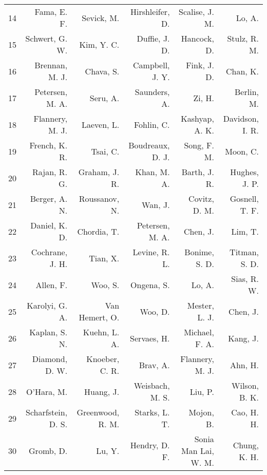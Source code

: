 \begin{tabular}{lrrrrr}
14 &                       Fama, E. F. &             Sevick, M. &        Hirshleifer, D. &         Scalise, J. M. &                 Lo, A. \\
15 &                    Schwert, G. W. &             Kim, Y. C. &          Duffie, J. D. &            Hancock, D. &           Stulz, R. M. \\
16 &                    Brennan, M. J. &              Chava, S. &        Campbell, J. Y. &            Fink, J. D. &               Chan, K. \\
17 &                   Petersen, M. A. &               Seru, A. &           Saunders, A. &                 Zi, H. &             Berlin, M. \\
18 &                   Flannery, M. J. &             Laeven, L. &             Fohlin, C. &         Kashyap, A. K. &        Davidson, I. R. \\
19 &                     French, K. R. &               Tsai, C. &       Boudreaux, D. J. &            Song, F. M. &               Moon, C. \\
20 &                      Rajan, R. G. &          Graham, J. R. &            Khan, M. A. &           Barth, J. R. &          Hughes, J. P. \\
21 &                     Berger, A. N. &          Roussanov, N. &                Wan, J. &          Covitz, D. M. &         Gosnell, T. F. \\
22 &                     Daniel, K. D. &            Chordia, T. &        Petersen, M. A. &               Chen, J. &                Lim, T. \\
23 &                   Cochrane, J. H. &               Tian, X. &          Levine, R. L. &          Bonime, S. D. &          Titman, S. D. \\
24 &                         Allen, F. &                Woo, S. &             Ongena, S. &                 Lo, A. &            Sias, R. W. \\
25 &                    Karolyi, G. A. &         Van Hemert, O. &                Woo, D. &          Mester, L. J. &               Chen, J. \\
26 &                     Kaplan, S. N. &           Kuehn, L. A. &            Servaes, H. &         Michael, F. A. &               Kang, J. \\
27 &                    Diamond, D. W. &         Knoeber, C. R. &               Brav, A. &        Flannery, M. J. &                Ahn, H. \\
28 &                        O'Hara, M. &              Huang, J. &        Weisbach, M. S. &                Liu, P. &          Wilson, B. K. \\
29 &                Scharfstein, D. S. &       Greenwood, R. M. &          Starks, L. T. &              Mojon, B. &             Cao, H. H. \\
30 &                         Gromb, D. &                 Lu, Y. &          Hendry, D. F. &   Sonia Man Lai, W. M. &           Chung, K. H. \\
\bottomrule
\end{tabular}
